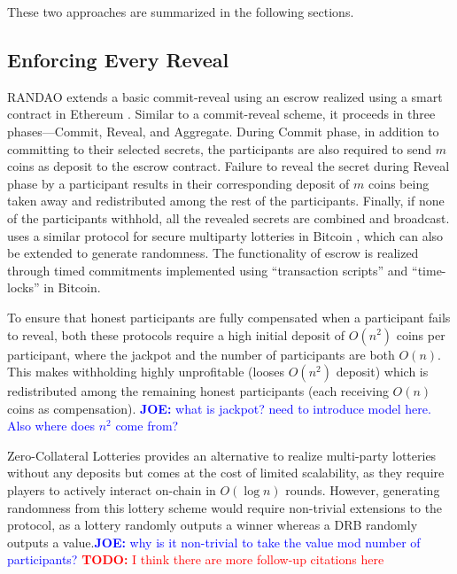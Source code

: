 \documentclass[letterpaper,twocolumn,10pt]{article}
\theoremstyle{definition}
\theoremstyle{remark}
\newcommand{\todo}[1]{\textcolor{red}{\textbf{TODO:} #1}}
\newcommand{\joenote}[1]{\textcolor{blue}{\textbf{JOE:} #1}}
\begin{document}
These two approaches are summarized in the following sections.


\subsection{Enforcing Every Reveal}
RANDAO \cite{youcai2017randao} extends a basic commit-reveal using an escrow realized using a smart contract in Ethereum \cite{wood2014ethereum}. Similar to a commit-reveal scheme, it proceeds in three phases---Commit, Reveal, and Aggregate. During Commit phase, in addition to committing to their selected secrets, the participants are also required to send $m$ coins as deposit to the escrow contract. Failure to reveal the secret during Reveal phase by a participant results in their corresponding deposit of $m$ coins being taken away and redistributed among the rest of the participants. Finally, if none of the participants withhold, all the revealed secrets are combined and broadcast. \cite{andrychowicz2014secure} uses a similar protocol for secure multiparty lotteries in Bitcoin \cite{nakamoto2019bitcoin}, which can also be extended to generate randomness. The functionality of escrow is realized through timed commitments implemented using ``transaction scripts'' and ``time-locks'' in Bitcoin. 

To ensure that honest participants are fully compensated when a participant fails to reveal, both these protocols require a high initial deposit of $O(n^2)$ coins per participant, where the jackpot and the number of participants are both $O(n)$. This makes withholding highly unprofitable (looses $O(n^2)$ deposit) which is redistributed among the remaining honest participants (each receiving $O(n)$ coins as compensation). \joenote{what is jackpot? need to introduce model here. Also where does $n^2$ come from?}

Zero-Collateral Lotteries \cite{miller2017zero} provides an alternative to realize multi-party lotteries without any deposits but comes at the cost of limited scalability, as they require players to actively interact on-chain in $O(\log n)$ rounds. However, generating randomness from this lottery scheme would require non-trivial extensions to the protocol, as a lottery randomly outputs a winner whereas a DRB randomly outputs a value.\joenote{why is it non-trivial to take the value mod number of participants?}
\todo{I think there are more follow-up citations here}
\end{document}
